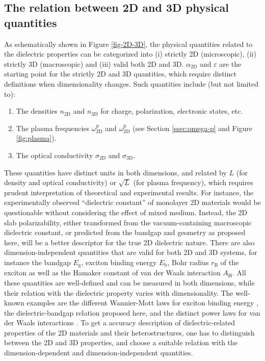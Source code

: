 \documentclass[manuscript=suppinfo,email=true,hyperref=true,keywords=false]{achemso}
\begin{document}
\subsection{The relation between 2D and 3D physical quantities}
As schematically shown in Figure \ref{fig-2D-3D}, the physical
quantities related to the dielectric properties can be categorized
into (i) strictly 2D (microscopic), (ii) strictly 3D (macroscopic) and
(iii) valid both 2D and 3D.  $\alpha_{\mathrm{2D}}$ and $\varepsilon$ are the
starting point for the strictly 2D and 3D quantities, which require
distinct definitions when dimensionality changes. Such quantities
include (but not limited to):
\begin{enumerate}
\item The densities $n_{\mathrm{2D}}$ and $n_{\mathrm{3D}}$ for
  charge, polarization, electronic states, etc.
  
\item The plasma frequencies $\omega^{\mathrm{p}}_{\mathrm{2D}}$ and
  $\omega^{\mathrm{p}}_{\mathrm{2D}}$\cite{Nazarov_2015_2D_3D} (see
  Section \ref{ssec:omega-p} and Figure \ref{fig:plasma}).

\item The optical conductivity $\sigma_{\mathrm{2D}}$ and
  $\sigma_{\mathrm{3D}}$\cite{Bechstedt_2012,Matthes_2016}.
\end{enumerate}
These quantities have distinct units in both dimensions, and related
by $L$ (for density and optical conductivity) or $\sqrt{L}$ (for
plasma frequency), which requires prudent interpretation of
theoretical and experimental results. For instance, the experimentally
observed ``dielectric constant'' of monolayer 2D materials
\cite{Ning_2015,Li_2014,Yao_2014,Wu_2015} would be questionable
without considering the effect of mixed medium. Instead, the 2D slab
polarizability, either transformed from the vacuum-containing
macroscopic dielectric constant, or predicted from the bandgap and
geometry as proposed here, will be a better descriptor for the true 2D
dielectric nature. There are also
dimension-independent quantities that are valid for both 2D and 3D
systems, for instance the bandgap $E_{\mathrm{g}}$, exciton binding
energy $E_{\mathrm{b}}$, Bohr radius $r_{\mathrm{B}}$ of the exciton
as well as the Hamaker constant of van der Waals interaction
$A_{\mathrm{H}}$. All these quantities are well-defined and can be
measured in both dimensions, while their relation with the dielectric
property varies with dimensionality. The well-known examples are the
different Wannier-Mott laws for exciton binding energy
\cite{Olsen_2016_hydrogen}, the dielectric-bandgap relation
proposed here, and the distinct power laws for van der Waals
interactions \cite{Gobre_2013}. To get a accuracy description of
dielectric-related properties of the 2D materials and their
heterostructures, one has to distinguish between the 2D and 3D
properties, and choose a suitable relation with the
dimension-dependent and dimension-independent quantities.
\end{document}
